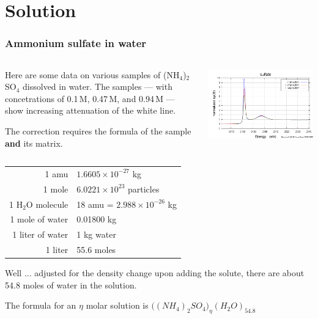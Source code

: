 \documentclass[10pt, xcolor=x11names, compress]{beamer}
\begin{document}
\section{Solution}
\begin{frame}
  \frametitle{Ammonium sulfate in water}
    \small
  
  \begin{columns}
    \begin{column}{0.5\linewidth}
      Here are some data on various samples of (NH$_4$)$_2$SO$_4$
      dissolved in water.  The samples --- with concetrations of
      0.1\,M, 0.47\,M, and 0.94\,M --- show increasing attenuation of
      the white line.

      \smallskip

      The correction requires the formula of the sample \textbf{and}
      its matrix.
    \end{column}
    \begin{column}{0.5\linewidth}
      \includegraphics[width=\linewidth]{images/sulfate.png}
    \end{column}
  \end{columns}
  \begin{center}
    \begin{tabular}{r@{~=~}l}
      1 amu & $1.6605\times10^{-27}$ kg \\
      1 mole & $6.0221\times10^{23}$ particles \\
      1 H$_2$O molecule & 18 amu  = $2.988 \times 10^{-26}$ kg \\
      1 mole of water & 0.01800 kg \\
      1 liter of water & 1 kg water \\
      1 liter &  55.6 moles
    \end{tabular}
  \end{center}

  Well ... adjusted for the density change upon adding the solute,
  there are about 54.8 moles of water in the solution.

  \medskip

  The formula for an $\eta$ molar solution is
  \alert{$\big((NH_4)_2SO_4\big)_\eta(H_2O)_{54.8}$}
\end{frame}
\end{document}
